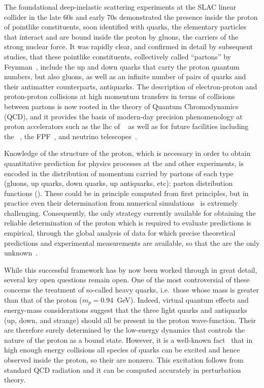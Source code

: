 
The foundational deep-inelastic scattering experiments at the SLAC linear collider
in the late 60s and early 70s demonstrated the presence inside the
proton of pointlike  constituents, soon identified with quarks, the
elementary particles that interact and are bound inside the proton by
gluons, the carriers of the strong  nuclear force.
%
It was rapidly clear, and confirmed in detail by subsequent studies,
that these pointlike constituents, collectively called ``partons'' by
Feynman~\cite{Feynman:1969wa}, include the up and down quarks that
carry the proton quantum numbers, but also gluons, as well
as an infinite number of pairs of quarks and their
antimatter counterparts, antiquarks.
%
The description of electron-proton and proton-proton collisions at high
momentum transfers in terms of collisions between partons is now rooted in the
theory of Quantum  Chromodynamics (QCD), and it provides the basis of
modern-day precision phenomenology at proton accelerators such as the
\acrfull{lhc} of \cern~\cite{Gao:2017yyd} as well as for future facilities
including the \eic~\cite{AbdulKhalek:2021gbh}, the FPF~\cite{Feng:2022inv}, and 
neutrino telescopes~\cite{IceCube-Gen2:2020qha}.

Knowledge of the structure of the proton, which is necessary in order
to obtain
quantitative prediction for physics processes at the \lhc and other
experiments, is encoded in
the distribution of  momentum carried by partons of each type
(gluons, up quarks, down quarks, up antiquarks, etc):
parton distribution functions (\pdfs).
%
These \pdfs could be in principle
computed from first principles, but in
practice even their determination from numerical
simulations~\cite{Constantinou:2020hdm} is extremely challenging.
%
Consequently,  the only 
strategy currently available for obtaining the
reliable determination of the proton \pdfs which is required to evaluate \lhc
predictions is empirical, through the global analysis of
data for which precise theoretical predictions and experimental
measurements are available, so that the \pdfs are the only
unknown~\cite{Gao:2017yyd}.

While this successful framework has by now been worked through in great detail, several key open questions remain open.
%
One of the most controversial of these concerns the treatment of
so-called heavy quarks, i.e.\ those whose mass is greater than that of
the proton ($m_p=0.94$~GeV). Indeed, virtual quantum effects and
energy-mass considerations suggest that the three light quarks and
antiquarks (up, 
down, and strange) should all be present in the proton
wave-function.
%
Their \pdfs are therefore surely determined by the low-energy
dynamics that controls the nature of the proton as a bound
state.
%
However, it is a well-known fact~\cite{DeRoeck:2011na,
  Kovarik:2019xvh,Gao:2017yyd,Rojo:2019uip}
that in high enough energy collisions all species of quarks can be
excited and hence observed
inside the proton, so their \pdfs are nonzero.
%
This excitation
follows from standard QCD radiation and it can be computed accurately
in perturbation theory.

